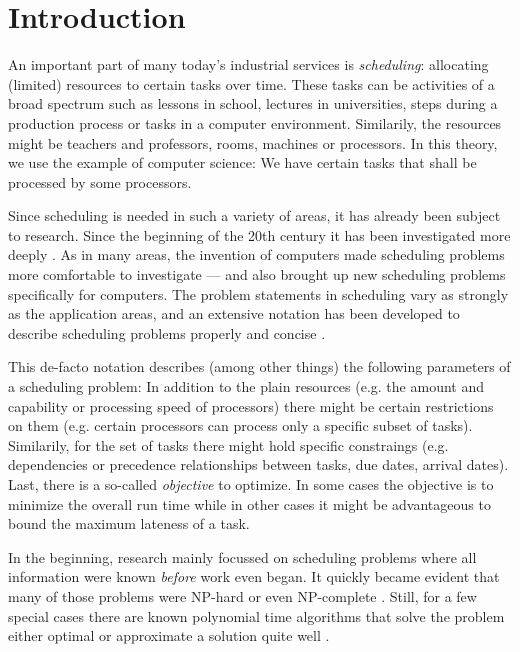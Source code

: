 \chapter{Introduction}
\label{chap:introduction}

An important part of many today's industrial services is \emph{scheduling}: allocating (limited) resources to certain tasks over time. These tasks can be activities of a broad spectrum such as lessons in school, lectures in universities, steps during a production process or tasks in a computer environment. Similarily, the resources might be teachers and professors, rooms, machines or processors. In this theory, we use the example of computer science: We have certain tasks that shall be processed by some processors.

Since scheduling is needed in such a variety of areas, it has already been subject to research. Since the beginning of the 20th century it has been investigated more deeply \cite{pinedo2008scheduling}. As in many areas, the invention of computers made scheduling problems more comfortable to investigate --- and also brought up new scheduling problems specifically for computers. The problem statements in scheduling vary as strongly as the application areas, and an extensive notation has been developed to describe scheduling problems properly and concise \cite{schedulingclassification,pinedo2008scheduling}.

This de-facto notation describes (among other things) the following parameters of a scheduling problem: In addition to the plain resources (e.g. the amount and capability or processing speed of processors) there might be certain restrictions on them (e.g. certain processors can process only a specific subset of tasks). Similarily, for the set of tasks there might hold specific constraings (e.g. dependencies or precedence relationships between tasks, due dates, arrival dates). Last, there is a so-called \emph{objective} to optimize. In some cases the objective is to minimize the overall run time while in other cases it might be advantageous to bound the maximum lateness of a task.

In the beginning, research mainly focussed on scheduling problems where all information were known \emph{before} work even began. It quickly became evident that many of those problems were NP-hard or even NP-complete
\cite{Ullman:1975:NSP:1739944.1740138,
  computers-intractability,
  short-shop-schedules-np,
  flowshop-jobshop-garey-np}
.
Still, for a few special cases there are known polynomial time algorithms that solve the problem either optimal or approximate a solution quite well \cite{pinedo2008scheduling}.

